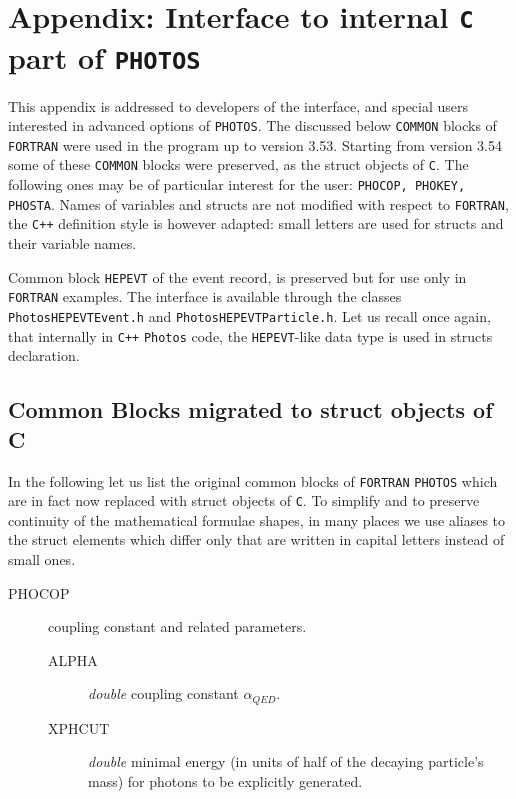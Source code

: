 \documentclass[]{Photos_interface_design}
\begin{document}
{}
% 






\newpage
\appendix

\section{Appendix: Interface to internal {\tt C} part of {\tt PHOTOS}}
\label{Interface to PHOTOS}


This appendix is addressed to developers of the interface,
and special users interested in advanced options of {\tt PHOTOS}.
The discussed below {\tt COMMON} blocks of {\tt FORTRAN} were used in the
program up  to version 3.53.
Starting from version 3.54 some of these {\tt COMMON}  blocks were preserved,
as the struct objects of {\tt C}. The following ones may be of particular interest for the
user:
{\tt PHOCOP, PHOKEY, PHOSTA}.
Names of variables and structs are not modified with respect to {\tt FORTRAN}, 
the  {\tt C++} definition style is however adapted: small letters are used 
for structs and their variable names.

Common block {\tt HEPEVT} of the event record, is preserved but for use only in {\tt FORTRAN} examples.  
The interface is available
through the classes {\tt PhotosHEPEVTEvent.h} and {\tt PhotosHEPEVTParticle.h}.
Let us recall once again, that internally in {\tt C++}  {\tt Photos} code, the {\tt HEPEVT}-like  data type
is used in structs declaration.

\subsection{Common Blocks migrated to struct objects of C}

In the following let us list the original common blocks of {\tt FORTRAN} {\tt PHOTOS} which are in fact now replaced with struct objects of {\tt C}. 
To simplify 
and to preserve continuity of  the mathematical formulae shapes,
in many places  we  use  aliases to the struct elements  
which differ only that are  written in capital letters instead of small ones.



\begin{description}
\item[PHOCOP] coupling constant and related parameters.
    \begin{description}
	\item[ALPHA]  \textit{double} coupling constant $\alpha_{QED}$.
	\item[XPHCUT] \textit{double} minimal energy (in units of half of the decaying particle's mass) for photons to be explicitly generated.
    \end{description}
\end{description}
\end{document}
